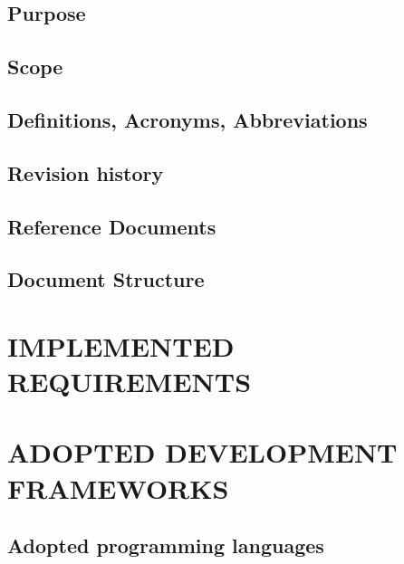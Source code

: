 \documentclass[11pt]{report}
\begin{document}
		\section{Purpose}
		\label{sect:Purpose}
			
			
		\section{Scope}
		\label{sect:Scope}
			
			
		\section{Definitions, Acronyms, Abbreviations}
		\label{sect:Definitions, Acronyms, Abbreviations}
			
			
			
			
		\section{Revision history}
		\label{sect:Revision history}
			
			
		\section{Reference Documents}
		\label{sect:Documents}
			
			
		\section{Document Structure}
		\label{sect:Document Structure}
			
			
	\chapter{IMPLEMENTED REQUIREMENTS}
	\label{ch:IMPLEMENTED REQUIREMENTS}
		
			
	\chapter{ADOPTED DEVELOPMENT FRAMEWORKS}
	\label{ch:ADOPTED DEVELOPMENT FRAMEWORKS}
	
		\section{Adopted programming languages}
		\label{sect:Adopted programming languages}
			
			
\end{document}
